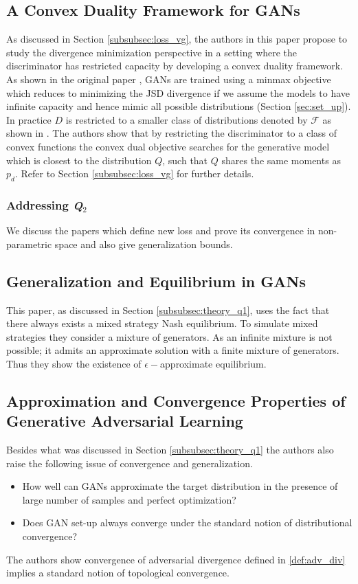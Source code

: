 \subsection*{A Convex Duality Framework for GANs \citep{convDual}}
As discussed in Section \ref{subsubsec:loss_vg}, the authors in this paper propose to study the divergence minimization perspective in a setting where the discriminator has restricted capacity by developing a convex duality framework.
As shown in the original paper \cite{ganGoodfellow}, GANs are trained using a minmax objective which reduces to minimizing the JSD divergence if we assume the models to have infinite capacity and hence mimic all possible distributions (Section \ref{sec:set_up}). In practice $D$ is restricted to a smaller class of distributions denoted by $\mathcal{F}$ as shown in \citep{Arora03}.  The authors show that by restricting the discriminator to a class of convex functions the convex dual objective searches for the generative model which is closest to the distribution $Q$, such that $Q$ shares the same moments as $p_d$. Refer to Section \ref{subsubsec:loss_vg} for further details.



\subsubsection{Addressing \emph{Q$_2$}} \label{subsubsec:theory_q2} We discuss the papers which define new loss and prove its convergence in non-parametric space and also give generalization bounds.
\subsection*{Generalization and Equilibrium in GANs \citep{Arora03}} This paper, as discussed in Section \ref{subsubsec:theory_q1}, uses the fact that there always exists a mixed strategy Nash equilibrium. To simulate mixed strategies they consider a mixture of generators.  As an infinite mixture is not possible; it admits an approximate solution with a finite mixture of generators. Thus they show the existence of $\epsilon-$approximate equilibrium. 

\subsection*{Approximation and Convergence Properties of Generative Adversarial Learning \citep{app_conv}}
Besides what was discussed in Section \ref{subsubsec:theory_q1} the authors also raise the following issue of convergence and generalization. 
\begin{itemize}
    \item How well can GANs approximate the target distribution in the presence of large number of samples and perfect optimization?
    \item Does GAN set-up always converge under the standard notion of distributional convergence?
\end{itemize}{}
The authors show convergence of adversarial divergence defined in \ref{def:adv_div} implies a standard notion of topological convergence. 




